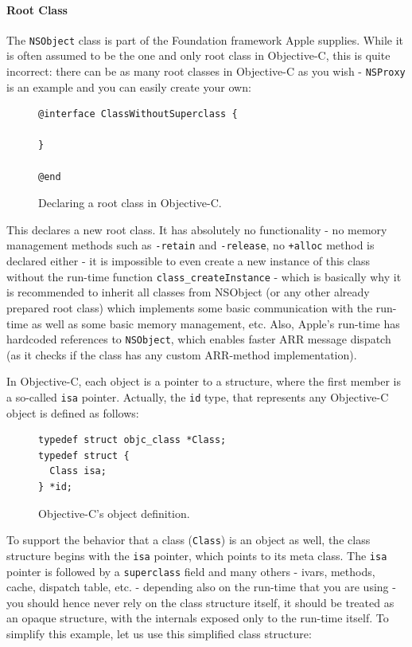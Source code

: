 \paragraph{Root Class}
The \verb=NSObject= class is part of the Foundation framework Apple supplies. While it is often assumed to be the one and only root class in Objective-C, this is quite incorrect: there can be as many root classes in Objective-C as you wish - \verb=NSProxy= is an example and you can easily create your own:

\begin{figure}[H]
\begin{verbatim}@interface ClassWithoutSuperclass {
  
}

@end\end{verbatim}
  \centering{}
  \caption{Declaring a root class in Objective-C.}
  \label{fig:objc_root_class}
\end{figure}

This declares a new root class. It has absolutely no functionality - no memory management methods such as \verb=-retain= and \verb=-release=, no \verb=+alloc= method is declared either - it is impossible to even create a new instance of this class without the run-time function \verb=class_createInstance= - which is basically why it is recommended to inherit all classes from NSObject (or any other already prepared root class) which implements some basic communication with the run-time as well as some basic memory management, etc. Also, Apple's run-time has hardcoded references to \verb=NSObject=, which enables faster ARR message dispatch (as it checks if the class has any custom ARR-method implementation).

In Objective-C, each object is a pointer to a structure, where the first member is a so-called \verb=isa= pointer. Actually, the \verb=id= type, that represents any Objective-C object is defined as follows:

\begin{figure}[H]
\begin{verbatim}
typedef struct objc_class *Class;
typedef struct {
  Class isa;
} *id;
\end{verbatim}
  \centering{}
  \caption{Objective-C's object definition.}
  \label{fig:objc_obj_def}
\end{figure}

To support the behavior that a class (\verb=Class=) is an object as well, the class structure begins with the \verb=isa= pointer, which points to its meta class. The \verb=isa= pointer is followed by a \verb=superclass= field and many others - ivars, methods, cache, dispatch table, etc. - depending also on the run-time that you are using - you should hence never rely on the class structure itself, it should be treated as an opaque structure, with the internals exposed only to the run-time itself. To simplify this example, let us use this simplified class structure:

